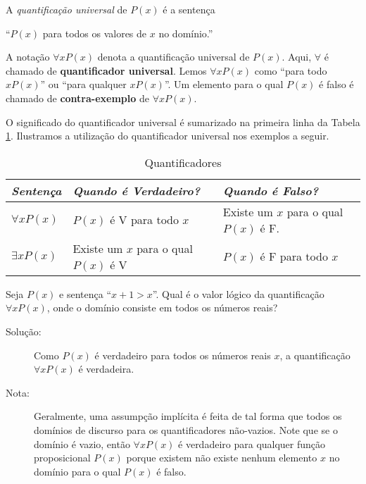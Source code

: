 \begin{defn}
\label{def19}
A \emph{quantificação universal} de $P(x)$ é a sentença
\begin{center}``$P(x)$ para todos os valores de $x$ no domínio.''\end{center}
A notação $\forall xP(x)$ denota a quantificação universal de $P(x)$. Aqui,
$\forall$ é chamado de \textbf{quantificador universal}. Lemos $\forall xP(x)$
como ``para todo $xP(x)$'' ou ``para qualquer $xP(x)$''. Um elemento para o qual
$P(x)$ é falso é chamado de \textbf{contra-exemplo} de $\forall xP(x)$.
\end{defn}

O significado do quantificador universal é sumarizado na primeira linha da
Tabela \ref{tabela:127}. Ilustramos a utilização do quantificador universal nos
exemplos a seguir.

\begin{table}[H]
\centering
\begin{tabular}{|l|l|l|}%
\toprule
\textbf{\emph{Sentença}} & \textbf{\emph{Quando é Verdadeiro?}} &
\textbf{\emph{Quando é Falso?}}\\
\midrule
$\forall xP(x)$ & $P(x)$ é V para todo $x$	& Existe um $x$ para o
qual $P(x)$ é F.\\
$\exists xP(x)$ & Existe um $x$ para o qual $P(x)$ é V & $P(x)$ é F
para todo $x$\\
\bottomrule%
\end{tabular}%
\caption{Quantificadores}
\label{tabela:127}
\end{table}

\begin{exmp}
\label{exem133}
Seja $P(x)$ e sentença ``$x + 1>x$''. Qual é o valor lógico da quantificação
$\forall xP(x)$, onde o domínio consiste em todos os números reais?
\end{exmp}
\begin{description}
\item[Solução:] Como $P(x)$ é verdadeiro para todos os números reais $x$, a
quantificação $\forall xP(x)$ é verdadeira.
\item[Nota:] Geralmente, uma assumpção implícita é feita de tal forma que todos
os domínios de discurso para os quantificadores não-vazios. Note que se o
domínio é vazio, então $\forall xP(x)$ é verdadeiro para qualquer função
proposicional $P(x)$ porque existem não existe nenhum elemento $x$ no domínio
para o qual $P(x)$ é falso.
\end{description}

